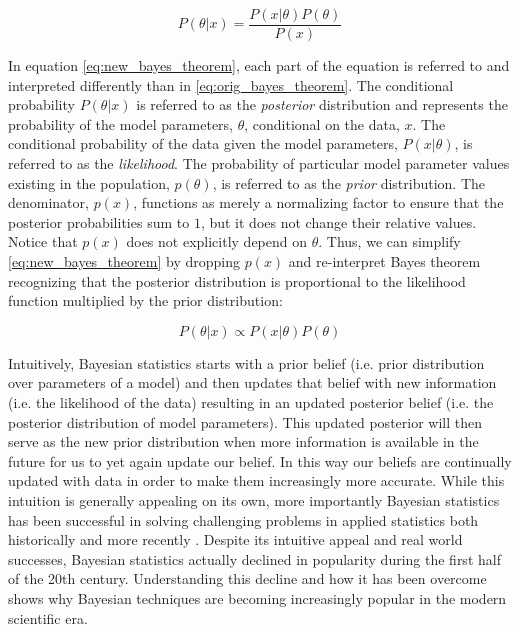 \begin{equation} \label{eq:new_bayes_theorem}
P(\theta|x) = \frac{P(x|\theta)P(\theta)}{P(x)}
\end{equation}

In equation \ref{eq:new_bayes_theorem}, each part of the equation is referred to and interpreted differently than in \ref{eq:orig_bayes_theorem}. The conditional probability $P(\theta|x)$ is referred to as the \textit{posterior} distribution and represents the probability of the model parameters, $\theta$, conditional on the data, $x$. The conditional probability of the data given the model parameters, $P(x|\theta)$, is referred to as the \textit{likelihood}. The probability of particular model parameter values existing in the population, $p(\theta)$, is referred to as the \textit{prior} distribution. The denominator, $p(x)$, functions as merely a normalizing factor to ensure that the posterior probabilities sum to $1$, but it does not change their relative values. Notice that $p(x)$ does not explicitly depend on $\theta$. Thus, we can simplify \ref{eq:new_bayes_theorem} by dropping $p(x)$ and re-interpret Bayes theorem recognizing that the posterior distribution is proportional to the likelihood function multiplied by the prior distribution:

\begin{equation} \label{eq:proportional_bayes_theorem}
P(\theta|x) \propto P(x|\theta)P(\theta)
\end{equation}

Intuitively, Bayesian statistics starts with a prior belief (i.e. prior distribution over parameters of a model) and then updates that belief with new information (i.e. the likelihood of the data) resulting in an updated posterior belief (i.e. the posterior distribution of model parameters). This updated posterior will then serve as the new prior distribution when more information is available in the future for us to yet again update our belief. In this way our beliefs are continually updated with data in order to make them increasingly more accurate. While this intuition is generally appealing on its own, more importantly Bayesian statistics has been successful in solving challenging problems in applied statistics both historically and more recently \cite{Schoot2021}. Despite its intuitive appeal and real world successes, Bayesian statistics actually declined in popularity during the first half of the 20th century. Understanding this decline and how it has been overcome shows why Bayesian techniques are becoming increasingly popular in the modern scientific era.

